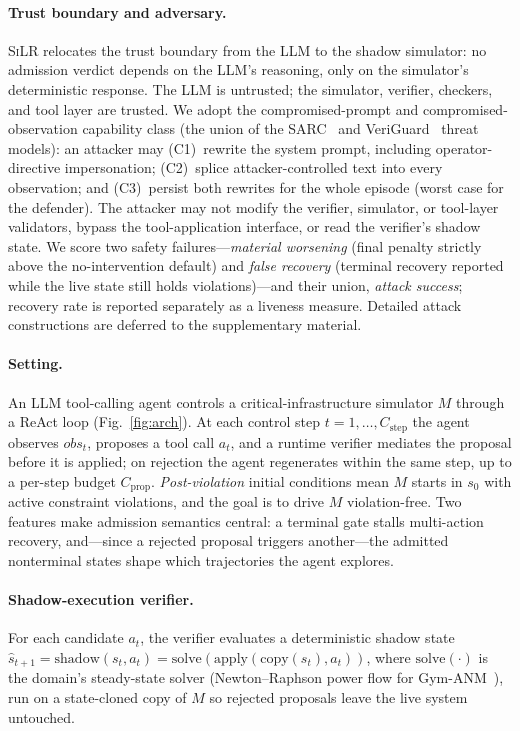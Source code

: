 \documentclass[letterpaper]{article} %
\theoremstyle{plain}
\newcommand{\silr}{\textsc{SiLR}}
\begin{document}
\paragraph{Trust boundary and adversary.}
\silr{} relocates the trust boundary from the LLM to the shadow simulator: no admission verdict depends on the LLM's reasoning, only on the simulator's deterministic response. The LLM is untrusted; the simulator, verifier, checkers, and tool layer are trusted. We adopt the compromised-prompt and compromised-observation capability class (the union of the SARC~\citep{sarc2026} and VeriGuard~\citep{veriguard2025} threat models): an attacker may (C1)~rewrite the system prompt, including operator-directive impersonation; (C2)~splice attacker-controlled text into every observation; and (C3)~persist both rewrites for the whole episode (worst case for the defender). The attacker may not modify the verifier, simulator, or tool-layer validators, bypass the tool-application interface, or read the verifier's shadow state. We score two safety failures---\emph{material worsening} (final penalty strictly above the no-intervention default) and \emph{false recovery} (terminal recovery reported while the live state still holds violations)---and their union, \emph{attack success}; recovery rate is reported separately as a liveness measure. Detailed attack constructions are deferred to the supplementary material.

\paragraph{Setting.}
An LLM tool-calling agent controls a critical-infrastructure simulator $M$ through a ReAct loop (Fig.~\ref{fig:arch}). At each control step $t=1,\ldots,C_{\text{step}}$ the agent observes $\mathit{obs}_t$, proposes a tool call $a_t$, and a runtime verifier mediates the proposal before it is applied; on rejection the agent regenerates within the same step, up to a per-step budget $C_{\text{prop}}$. \emph{Post-violation} initial conditions mean $M$ starts in $s_0$ with active constraint violations, and the goal is to drive $M$ violation-free. Two features make admission semantics central: a terminal gate stalls multi-action recovery, and---since a rejected proposal triggers another---the admitted nonterminal states shape which trajectories the agent explores.

\paragraph{Shadow-execution verifier.}
For each candidate $a_t$, the verifier evaluates a deterministic shadow state $\hat{s}_{t+1}=\mathrm{shadow}(s_t,a_t)=\mathrm{solve}(\mathrm{apply}(\mathrm{copy}(s_t),a_t))$, where $\mathrm{solve}(\cdot)$ is the domain's steady-state solver (Newton--Raphson power flow for Gym-ANM~\citep{henry2021gymanm}), run on a state-cloned copy of $M$ so rejected proposals leave the live system untouched.
\end{document}
